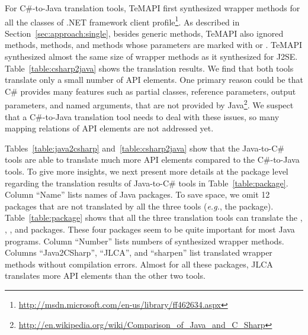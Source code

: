 For C\#-to-Java translation tools, TeMAPI first synthesized wrapper methods for all the classes of .NET framework client profile\footnote{\url{http://msdn.microsoft.com/en-us/library/ff462634.aspx}}. As described in Section~\ref{sec:approach:single}, besides generic methods, TeMAPI also ignored  methods,  methods, and methods whose parameters are marked with  or . TeMAPI synthesized almost the same size of wrapper methods as it synthesized for J2SE. Table~\ref{table:csharp2java} shows the translation results. We find that both tools translate only a small number of API elements. One primary reason could be that C\# provides many features such as partial classes, reference parameters, output parameters, and named arguments, that are not provided by Java\footnote{\url{http://en.wikipedia.org/wiki/Comparison_of_Java_and_C_Sharp}}. We suspect that a C\#-to-Java translation tool needs to deal with these issues, so many mapping relations of API elements are not addressed yet.

Tables~\ref{table:java2csharp} and~\ref{table:csharp2java} show that the Java-to-C\# tools are able to translate much more API elements compared to the C\#-to-Java tools. To give more insights, we next present more details at the package level regarding the translation results of Java-to-C\# tools in Table~\ref{table:package}. Column ``Name'' lists names of Java packages. To save space, we omit 12 packages that are not translated by all the three tools (\emph{e.g.}, the  package). Table~\ref{table:package} shows that all the three translation tools can translate the , , , and  packages. These four packages seem to be quite important for most Java programs. Column ``Number'' lists numbers of synthesized wrapper methods. Columns ``Java2CSharp'', ``JLCA'', and ``sharpen'' list translated wrapper methods without compilation errors. Almost for all these packages, JLCA translates more API elements than the other two tools. 

